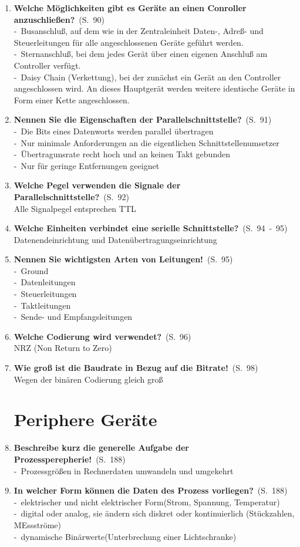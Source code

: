 \documentclass[a4paper,12pt]{article}
\newcommand{\question}[3]{\pagebreak[3]\item {\textbf{#1?}}\ (S.\ #2)#3}
\newcommand{\statement}[3]{\pagebreak[3]\item {\textbf{#1!}}\ (S.\ #2)#3}
\newcommand{\catchword}[1]{\\-\ #1}
\newcommand{\normaltext}[1]{\\#1}
\newcommand{\page}[1]{#1}
\newcommand{\pages}[2]{#1\ -\ #2}
\begin{document}
\begin{enumerate}
  \question{Welche Möglichkeiten gibt es Geräte an einen Conroller anzuschließen}{\page{90}}
  {
    \catchword{Busanschluß, auf dem wie in der Zentraleinheit Daten-, Adreß- und Steuerleitungen
    für alle angeschlossenen Geräte geführt werden.}
    \catchword{Sternanschluß, bei dem jedes Gerät über einen eigenen Anschluß am Controller verfügt.}
    \catchword{Daisy Chain (Verkettung), bei der zunächst ein Gerät an den Controller angeschlossen wird.
    An dieses Hauptgerät werden weitere identische Geräte in Form einer Kette angeschlossen.}
  }

  \question{Nennen Sie die Eigenschaften der Parallelschnittstelle}{\page{91}}
  {
    \catchword{Die Bits eines Datenworts werden parallel übertragen}
    \catchword{Nur minimale Anforderungen an die eigentlichen Schnittstellenumsetzer}
    \catchword{Übertragunsrate recht hoch und an keinen Takt gebunden}
    \catchword{Nur für geringe Entfernungen geeignet}
  }

  \question{Welche Pegel verwenden die Signale der Parallelschnittstelle}{\page{92}}
  {
    \normaltext{Alle Signalpegel entsprechen TTL}
  }

  \question{Welche Einheiten verbindet eine serielle Schnittstelle}{\pages{94}{95}}
  {
    \normaltext{Datenendeinrichtung und Datenübertragungseinrichtung}
  }

  \statement{Nennen Sie wichtigsten Arten von Leitungen}{\page{95}}
  {
    \catchword{Ground}
    \catchword{Datenleitungen}
    \catchword{Steuerleitungen}
    \catchword{Taktleitungen}
    \catchword{Sende- und Empfangsleitungen}
  }

  \question{Welche Codierung wird verwendet}{\page{96}}
  {
    \normaltext{NRZ (Non Return to Zero)}
  }

  \statement{Wie groß ist die Baudrate in Bezug auf die Bitrate}{\page{98}}
  {
    \normaltext{Wegen der binären Codierung gleich groß}
  }




  \newpage
  \section{Periphere Geräte}
  
  \statement{Beschreibe kurz die generelle Aufgabe der Prozessperepherie}{\page{188}}
  {
    \catchword{Prozessgrößen in Rechnerdaten umwandeln und umgekehrt}
  }
  
  \question{In welcher Form können die Daten des Prozess vorliegen}{\page{188}}
  {
    \catchword{elektrischer und nicht elektrischer Form(Strom, Spannung, Temperatur)}
    \catchword{digital oder analog, sie ändern sich diskret oder kontinuierlich (Stückzahlen, MEssströme)}
    \catchword{dynamische Binärwerte(Unterbrechung einer Lichtschranke)}
  }
  

\end{enumerate}
\end{document}
